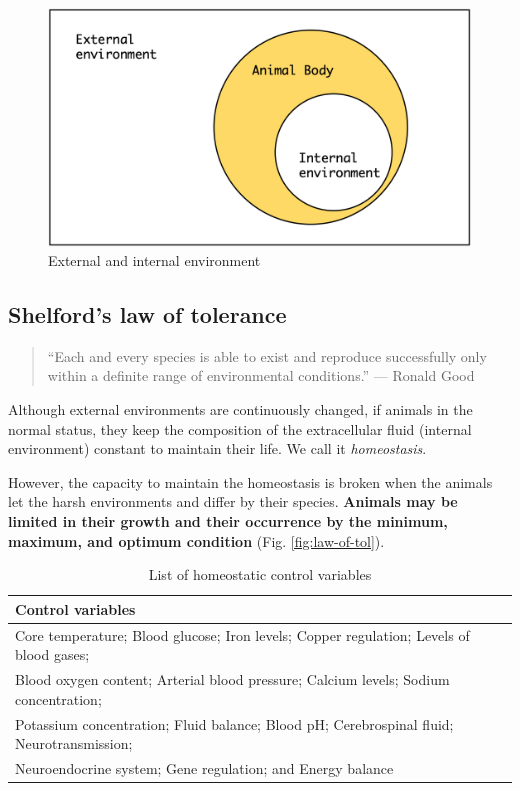 \documentclass[]{book}
\begin{document}
\begin{figure}

\includegraphics[width=0.6\linewidth]{figures/animal-env} \hfill{}

\caption{External and internal environment}\label{fig:ext-int-env}
\end{figure}

\hypertarget{shelfords-law-of-tolerance}{%
\subsection{Shelford's law of tolerance}\label{shelfords-law-of-tolerance}}

\begin{quote}
``Each and every species is able to exist and reproduce successfully only within a definite range of environmental conditions.'' --- Ronald Good
\end{quote}

Although external environments are continuously changed, if animals in the normal status, they keep the composition of the extracellular fluid (internal environment) constant to maintain their life. We call it \emph{homeostasis}.

However, the capacity to maintain the homeostasis is broken when the animals let the harsh environments and differ by their species. \textbf{Animals may be limited in their growth and their occurrence by the minimum, maximum, and optimum condition} \citep{shelford} (Fig. \ref{fig:law-of-tol}).

\begin{table}

\caption{\label{tab:homeostasis}List of homeostatic control variables}
\centering
\begin{tabular}[t]{l}
\toprule
Control variables\\
\midrule
Core temperature; Blood glucose; Iron levels; Copper regulation; Levels of blood gases;\\
Blood oxygen content; Arterial blood pressure; Calcium levels; Sodium concentration;\\
Potassium concentration; Fluid balance; Blood pH; Cerebrospinal fluid; Neurotransmission;\\
Neuroendocrine system; Gene regulation; and Energy balance\\
\bottomrule
\end{tabular}
\end{table}
\end{document}
